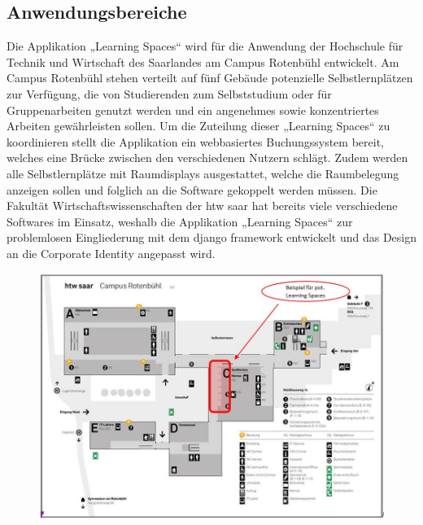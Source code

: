 \documentclass[a4paper,12pt]{article}
\begin{document}
\subsection{Anwendungsbereiche}
Die Applikation „Learning Spaces“ wird für die Anwendung der Hochschule für Technik und Wirtschaft des Saarlandes am Campus Rotenbühl entwickelt. Am Campus Rotenbühl stehen verteilt auf fünf Gebäude potenzielle Selbstlernplätzen zur Verfügung, die von Studierenden zum Selbststudium oder für Gruppenarbeiten genutzt werden und ein angenehmes sowie konzentriertes Arbeiten gewährleisten sollen. Um die Zuteilung dieser „Learning Spaces“ zu koordinieren stellt die Applikation ein webbasiertes Buchungssystem bereit, welches eine Brücke zwischen den verschiedenen Nutzern schlägt. Zudem werden alle Selbstlernplätze mit Raumdisplays ausgestattet, welche die Raumbelegung anzeigen sollen und folglich an die Software gekoppelt werden müssen. Die Fakultät Wirtschaftswissenschaften der htw saar hat bereits viele verschiedene Softwares im Einsatz, weshalb die Applikation „Learning Spaces“ zur problemlosen Eingliederung mit dem django framework entwickelt und das Design an die Corporate Identity angepasst wird.

\begin{figure}[h]
\includegraphics[width=1\textwidth]{Bilder/OrtSpaces}\\
\end{figure}

\newpage
\end{document}
